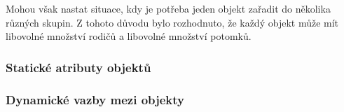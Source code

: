 Mohou však nastat situace, kdy je potřeba jeden objekt zařadit do několika různých skupin.
Z tohoto důvodu bylo rozhodnuto, že každý objekt může mít libovolné množství rodičů a libovolné množství potomků.

\subsubsection*{Statické atributy objektů}

\subsubsection*{Dynamické vazby mezi objekty}
